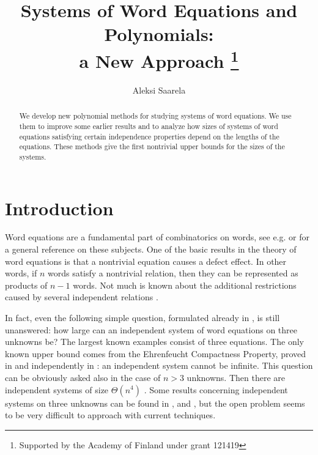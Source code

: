 \documentclass[submission]{eptcs}
\theoremstyle{definition}
\begin{document}
\title{Systems of Word Equations and Polynomials: \\ a New Approach
    \thanks{Supported by the Academy of Finland under grant 121419}
}
\author{Aleksi Saarela  }
\def\titlerunning{Systems of Word Equations and Polynomials: a New Approach}
\def\authorrunning{Aleksi Saarela}

\maketitle

\begin{abstract}
We develop new polynomial methods for studying systems of word
equations. We use them to improve some earlier results and to
analyze how sizes of systems of word equations satisfying certain
independence properties depend on the lengths of the equations.
These methods give the first nontrivial upper bounds for the sizes
of the systems.
\end{abstract}

\section{Introduction}

Word equations are a fundamental part of combinatorics on words, see
e.g. \cite{Lo83} or \cite{ChKa97} for a general reference on these
subjects. One of the basic results in the theory of word equations
is that a nontrivial equation causes a defect effect. In other
words, if $n$ words satisfy a nontrivial relation, then they can be
represented as products of $n-1$ words. Not much is known about the
additional restrictions caused by several independent relations
\cite{HaKa04}.

In fact, even the following simple question, formulated already in
\cite{CuKa83}, is still unanswered: how large can an independent
system of word equations on three unknowns be? The largest known
examples consist of three equations. The only known upper bound
comes from the Ehrenfeucht Compactness Property, proved in
\cite{AlLa85} and independently in \cite{Gu86}: an independent
system cannot be infinite. This question can be obviously asked also
in the case of $n > 3$ unknowns. Then there are independent systems
of size $\Theta(n^4)$ \cite{KaPl96}. Some results concerning
independent systems on three unknowns can be found in \cite{HaNo03},
\cite{CzKa07} and \cite{CzPl09}, but the open problem seems to be
very difficult to approach with current techniques.
\end{document}
